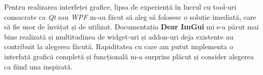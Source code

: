 \documentclass[12pt,a4paper]{report}
\newcommand{\worktype}[1]{[\textit{#1}] }
\newcommand{\dezvoltare}{\worktype{Dezvoltare de produs}}
\newcommand{\cercetare}{\worktype{Cercetare}}
\newcommand{\ambele}{\worktype{Ambele}}
\begin{document}
Pentru realizarea interfeței grafice, lipsa de experiență în lucrul cu tool-uri consacrate ca \textit{Qt} sau \textit{WPF} m-au făcut să aleg să folosesc o soluție imediată, care să fie ușor de învățat și de utilizat. Documentația \textbf{Dear ImGui} mi s-a părut mai bine realizată și multitudinea de widget-uri și addon-uri deja existente au contribuit la alegerea făcută. Rapiditatea cu care am putut implementa o interfață grafică completă și funcțională m-a surprins plăcut și consider alegerea ca fiind una inspirată.
% 
%
%
%
%
\end{document}

